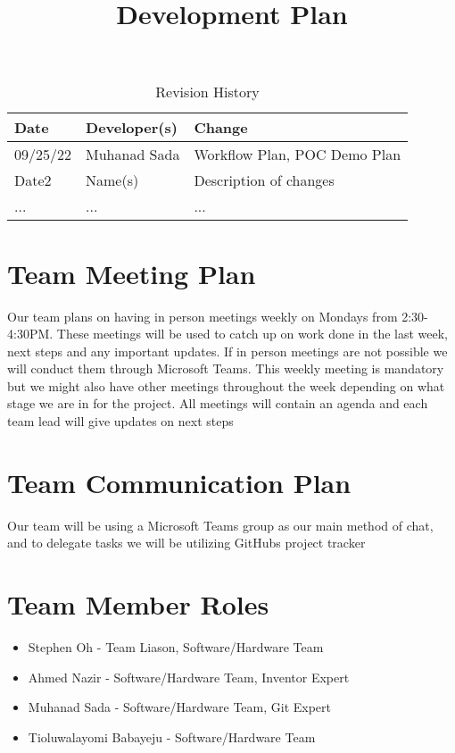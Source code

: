\documentclass{article}
\title{Development Plan\\\progname}
\author{\authname}
\date{}
\begin{document}
\begin{table}[hp]
\caption{Revision History} \label{TblRevisionHistory}
\begin{tabularx}{\textwidth}{llX}
\toprule
\textbf{Date} & \textbf{Developer(s)} & \textbf{Change}\\
\midrule
09/25/22 & Muhanad Sada & Workflow Plan, POC Demo Plan\\
Date2 & Name(s) & Description of changes\\
... & ... & ...\\
\bottomrule
\end{tabularx}
\end{table}

\newpage

\maketitle


\section{Team Meeting Plan}
Our team plans on having in person meetings weekly on Mondays from 2:30-4:30PM. These meetings will be used to catch up on work done in the last week, next steps and any important updates. If in person meetings are not possible we will conduct them through Microsoft Teams. This weekly meeting is mandatory but we might also have other meetings throughout the week depending on what stage we are in for the project. All meetings will contain an agenda and each team lead will give updates on next steps 

\section{Team Communication Plan}
Our team will be using a Microsoft Teams group as our main method of chat, and to delegate tasks we will be utilizing GitHubs project tracker

\section{Team Member Roles}
\begin{itemize}
	\item Stephen Oh - Team Liason, Software/Hardware Team
	\item Ahmed Nazir - Software/Hardware Team, Inventor Expert
	\item Muhanad Sada - Software/Hardware Team, Git Expert
	\item Tioluwalayomi Babayeju - Software/Hardware Team
\end{itemize}
\end{document}
